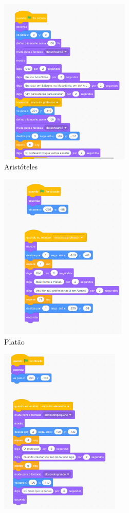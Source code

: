 \documentclass[12pt, openright, a4paper, brazil, english, french, spanish, bibjustif, openany, oneside]{abntex2}
\begin{document}
\begin{figure}[H]

 \centering
 
         \caption{Programação da História de Aristóteles \label{histaris}}
     \begin{subfigure}[b]{0.3\textwidth}
         \centering
         \includegraphics[height=8cm]{histaristoteles1.png}
         \caption*{Aristóteles}
         \label{aristoteles}
     \end{subfigure}
     \hfill
     \begin{subfigure}[b]{0.3\textwidth}
         \centering
         \includegraphics[height=8cm]{histaristoteles3platao.png}
         \caption*{Platão}
         \label{platao}
     \end{subfigure}
     \hfill
     \begin{subfigure}[b]{0.3\textwidth}
         \centering
         \includegraphics[height=8cm]{histaristoteles2alexandre.png}

\end{subfigure}
\end{figure}
\end{document}

